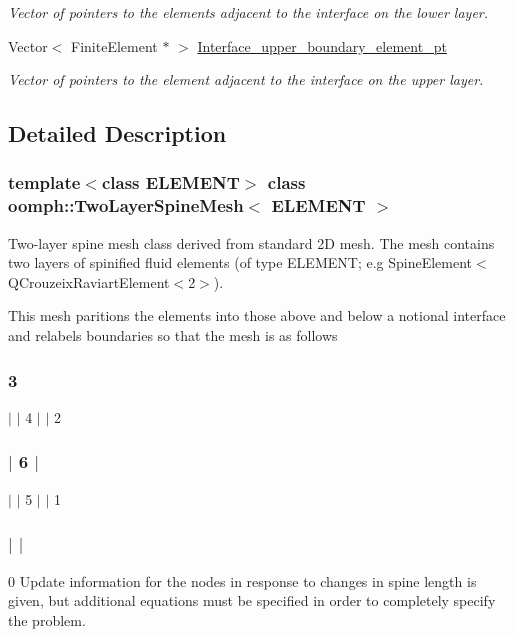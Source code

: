 \begin{DoxyCompactItemize}
\begin{DoxyCompactList}\small\item\em Vector of pointers to the elements adjacent to the interface on the lower layer. \end{DoxyCompactList}\item 
Vector$<$ Finite\+Element $\ast$ $>$ \hyperlink{classoomph_1_1TwoLayerSpineMesh_a81c2202c3169f9fe8c9342b5d95c1a9d}{Interface\+\_\+upper\+\_\+boundary\+\_\+element\+\_\+pt}
\begin{DoxyCompactList}\small\item\em Vector of pointers to the element adjacent to the interface on the upper layer. \end{DoxyCompactList}\end{DoxyCompactItemize}


\subsection{Detailed Description}
\subsubsection*{template$<$class E\+L\+E\+M\+E\+NT$>$\newline
class oomph\+::\+Two\+Layer\+Spine\+Mesh$<$ E\+L\+E\+M\+E\+N\+T $>$}

Two-\/layer spine mesh class derived from standard 2D mesh. The mesh contains two layers of spinified fluid elements (of type E\+L\+E\+M\+E\+NT; e.\+g Spine\+Element$<$Q\+Crouzeix\+Raviart\+Element$<$2$>$).

This mesh paritions the elements into those above and below a notional interface and relabels boundaries so that the mesh is as follows \subsubsection*{3 }

$\vert$ $\vert$ 4 $\vert$ $\vert$ 2 \subsubsection*{$\vert$ 6 $\vert$ }

$\vert$ $\vert$ 5 $\vert$ $\vert$ 1 \subsubsection*{$\vert$ $\vert$ }

0 Update information for the nodes in response to changes in spine length is given, but additional equations must be specified in order to completely specify the problem. 

